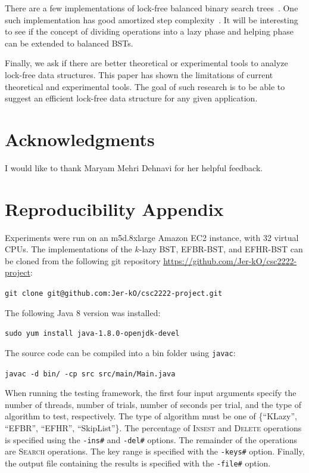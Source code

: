 \documentclass[letterpaper,twocolumn]{article}
\newcommand{\code}[1]{\texttt{#1}}
\begin{document}
There are a few implementations of lock-free balanced binary search trees~\cite{BrownER14}. One such implementation has good amortized step complexity~\cite{Ko18}. It will be interesting to see if the concept of dividing operations into a lazy phase and helping phase can be extended to balanced BSTs.

Finally, we ask if there are better theoretical or experimental tools to analyze lock-free data structures. This paper has shown the limitations of current theoretical and experimental tools. The goal of such research is to be able to suggest an efficient lock-free data structure for any given application.

\section{Acknowledgments}
I would like to thank Maryam Mehri Dehnavi for her helpful feedback.



\onecolumn
\appendix
\appendixpage
\section{Reproducibility Appendix}

Experiments were run on an m5d.8xlarge Amazon EC2 instance, with 32 virtual CPUs. The implementations of the $k$-lazy BST, EFBR-BST, and EFHR-BST can be cloned from the following git repository \url{https://github.com/Jer-kO/csc2222-project}:
\begin{center}
\code{git clone git@github.com:Jer-kO/csc2222-project.git}
\end{center}

\noindent The following Java 8 version was installed:
\begin{center}
	\code{sudo yum install java-1.8.0-openjdk-devel}
\end{center}

\noindent The source code can be compiled into a bin folder using \texttt{javac}:
\begin{center}
\code{javac -d bin/ -cp src src/main/Main.java}
\end{center}

When running the testing framework, the first four input arguments specify the number of threads, number of trials, number of seconds per trial, and the type of algorithm to test, respectively. The type of algorithm must be one of \{``KLazy'', ``EFBR'', ``EFHR'', ``SkipList''\}. The percentage of \textsc{Insest} and \textsc{Delete} operations is specified using the \texttt{-ins\#} and \texttt{-del\#} options. The remainder of the operations are \textsc{Search} operations. The key range is specified with the \texttt{-keys\#} option. Finally, the output file containing the results is specified with the \texttt{-file\#} option.
\end{document}
